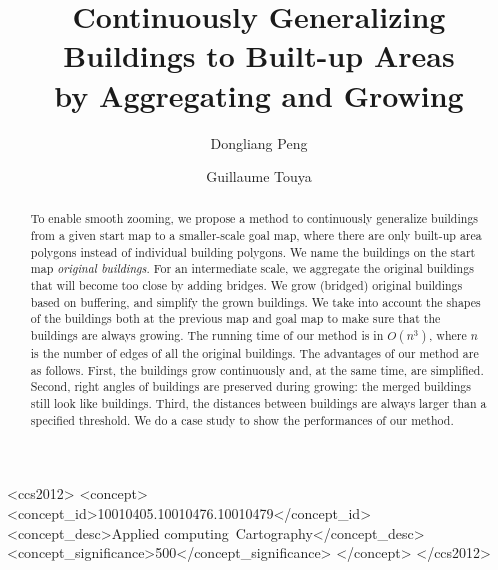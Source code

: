 \documentclass[
sigconf,
screen, %
]{acmart}
\begin{document}
\title{Continuously Generalizing Buildings to Built-up Areas\\ 
by Aggregating and Growing}


\author{Dongliang Peng}

\author{Guillaume Touya}


\renewcommand{\shortauthors}{D. Peng and G. Touya}


\begin{abstract}
To enable smooth zooming, we propose a method to continuously 
generalize buildings from a given start map to a smaller-scale goal map, where 
there are only built-up area polygons instead of individual building polygons.
We name the buildings on the start map \emph{original buildings}.
%
For an intermediate scale, 
we aggregate the original buildings that will become too close 
by adding bridges.
We grow (bridged) original buildings based on buffering, 
and simplify the grown buildings.
We take into account the shapes of the buildings 
both at the previous map and goal map to make sure that 
the buildings are always growing.
The running time of our method is in $O(n^3)$,
where $n$ is the number of edges of all the original buildings.
%
\newline\indent
The advantages of our method are as follows. 
First, the buildings grow continuously 
and, at the same time, are simplified.
Second, right angles of buildings are preserved during growing: 
the merged buildings still look like buildings. 
Third, the distances between buildings are 
always larger than a specified threshold.
We do a case study to show the performances of our method.
\end{abstract}

%
%
\begin{CCSXML}
	<ccs2012>
	<concept>
	<concept_id>10010405.10010476.10010479</concept_id>
	<concept_desc>Applied computing~Cartography</concept_desc>
	<concept_significance>500</concept_significance>
	</concept>
	</ccs2012>
\end{CCSXML}
\end{document}

